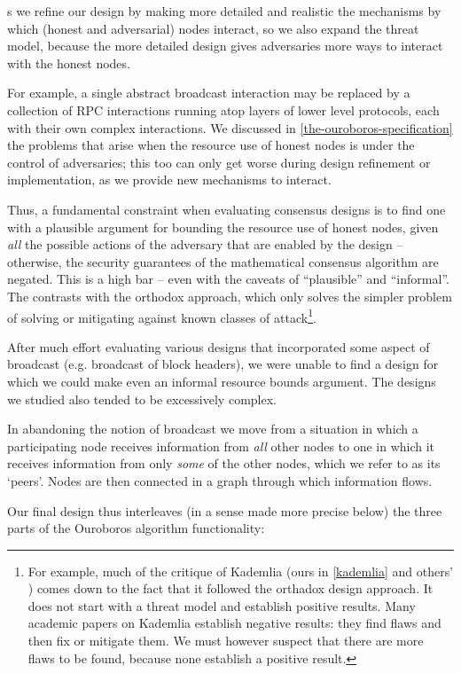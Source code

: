 \documentclass[11pt,a4paper]{article}
\begin{document}
s we refine our design by making more detailed and realistic the
mechanisms by which (honest and adversarial) nodes interact, so we also
expand the threat model, because the more detailed design gives
adversaries more ways to interact with the honest nodes.

For example, a single abstract broadcast interaction may be replaced by
a collection of RPC interactions running atop layers of lower level
protocols, each with their own complex interactions. We discussed in
\cref{the-ouroboros-specification} the
problems that arise when the resource use of honest nodes is under the
control of adversaries; this too can only get worse during design
refinement or implementation, as we provide new mechanisms to interact.

Thus, a fundamental constraint when evaluating consensus designs is to
find one with a plausible argument for bounding the resource use of
honest nodes, given \emph{all} the possible actions of the adversary
that are enabled by the design -- otherwise, the security guarantees of
the mathematical consensus algorithm are negated. This is a high bar --
even with the caveats of ``plausible'' and ``informal''. The contrasts
with the orthodox approach, which only solves the simpler problem of
solving or mitigating against known classes of attack\footnote{For
  example, much of the critique of Kademlia (ours in
  \cref{kademlia} and others' \cite{MHG18})
  comes down to the fact that it followed the orthadox design approach.
  It does not start with a threat model and establish positive results.
  Many academic papers on Kademlia establish negative results: they find
  flaws and then fix or mitigate them. We must however suspect that
  there are more flaws to be found, because none establish a positive
  result.}.

After much effort evaluating various designs that incorporated some
aspect of broadcast (e.g. broadcast of block headers), we were unable to
find a design for which we could make even an informal resource bounds
argument. The designs we studied also tended to be excessively complex.

In abandoning the notion of broadcast we move from a situation in which
a participating node receives information from \emph{all} other nodes to
one in which it receives information from only \emph{some} of the other
nodes, which we refer to as its `peers'. Nodes are then connected in a
graph through which information flows.

Our final design thus interleaves (in a sense made more precise below)
the three parts of the Ouroboros algorithm functionality:
\end{document}

